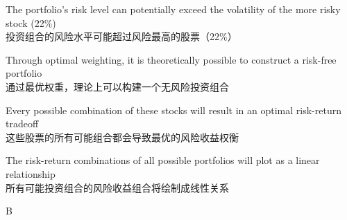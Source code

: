 \documentclass{article}
\begin{document}
\begin{choices}
    \item The portfolio's risk level can potentially exceed the volatility of the more risky stock (22\%)\\
    投资组合的风险水平可能超过风险最高的股票（22\%）
    
    \item Through optimal weighting, it is theoretically possible to construct a risk-free portfolio\\
    通过最优权重，理论上可以构建一个无风险投资组合
    
    \item Every possible combination of these stocks will result in an optimal risk-return tradeoff\\
    这些股票的所有可能组合都会导致最优的风险收益权衡
    
    \item The risk-return combinations of all possible portfolios will plot as a linear relationship\\
    所有可能投资组合的风险收益组合将绘制成线性关系
\end{choices}

\begin{correctanswer}
    B
\end{correctanswer}
\end{document}
